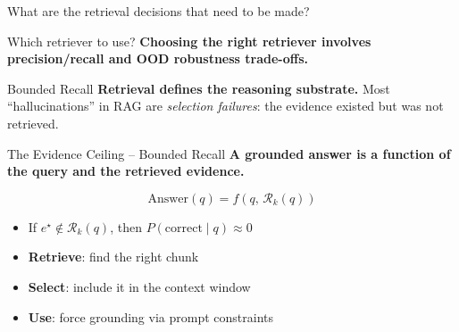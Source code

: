 \documentclass[aspectratio=169, xcolor=table]{beamer}
\newif\ifanimated
\newcommand{\cpause}{\ifanimated\pause\fi}
\begin{document}
\begin{frame}[plain]
\sectionpage
\end{frame}

\begin{frame}{What are the retrieval decisions that need to be made?}
\begin{center}
\resizebox{1.0\textwidth}{!}{

}
\end{center}
\end{frame}

\begin{frame}{Which retriever to use?}
\textbf{Choosing the right retriever involves precision/recall and OOD robustness trade-offs.}

\cpause
\vspace{0.7em}
\begin{table}
\centering
{}
\end{table}

\cpause
\vspace{0.3em}
\begin{block}{Bounded Recall}
\textbf{Retrieval defines the reasoning substrate.}
Most ``hallucinations'' in RAG are \emph{selection failures}: the evidence existed but was not retrieved.
\end{block}
\end{frame}

\begin{frame}{The Evidence Ceiling -- Bounded Recall}
\textbf{A grounded answer is a function of the query and the retrieved evidence.}

\vspace{0.8em}
\[ \text{Answer}(q) = f\!\left(q,\, \mathcal{R}_k(q)\right) \]
\cpause
\begin{itemize}
  \item If $e^\star \notin \mathcal{R}_k(q)$, then $P(\text{correct} \mid q) \approx 0$
  \item \textbf{Retrieve}: find the right chunk
  \item \textbf{Select}: include it in the context window
  \item \textbf{Use}: force grounding via prompt constraints
\end{itemize}
\end{frame}
\end{document}
